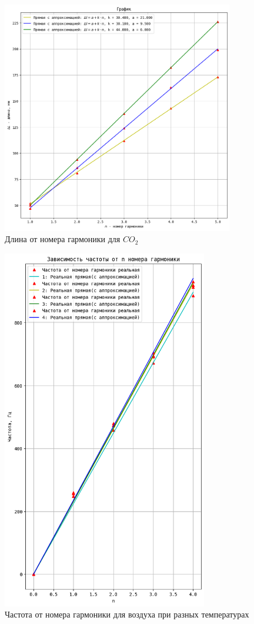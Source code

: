 \documentclass[a4paper, 12pt]{article}
\begin{document}
\begin{figure}[!p]
    \centering
    \includegraphics[width=0.9\textwidth]{graphic2.png}
    \caption{Длина от номера гармоники для $CO_2$}
\end{figure}

\begin{figure}[!p]
    \centering
    \includegraphics[width=0.8\textwidth]{graphic.png}
    \caption{Частота от номера гармоники для воздуха при разных температурах}
\end{figure}
\end{document}
